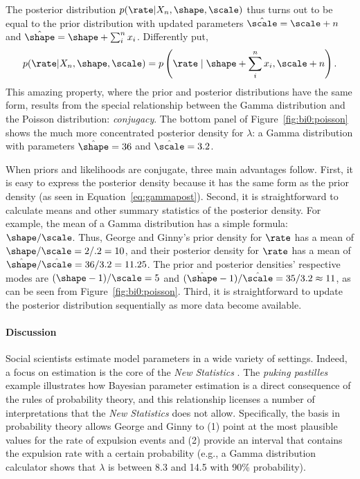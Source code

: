 The posterior distribution $p(\rate|X_n, \shape, \scale)$ thus turns out to be equal to the prior distribution with updated parameters $\hat\scale = \scale + n$ and $\hat\shape = \shape + \sum_i^n x_i$.  Differently put, \begin{equation}p(\rate|X_n,\shape,\scale) = p\left(\rate\mid\shape + \sum_i^n x_i, \scale + n\right).\label{eq:gammapost}\end{equation} This amazing property, where the prior and posterior distributions have the same form, results from the special relationship between the Gamma distribution and the Poisson distribution: \emph{conjugacy}. The bottom panel of Figure~\ref{fig:bi0:poisson} shows the much more concentrated posterior density for $\lambda$: a Gamma distribution with parameters $\hat\shape = 36$ and $\hat\scale = 3.2$. 

When priors and likelihoods are conjugate, three main advantages follow. First, it is easy to express the posterior density because it has the same form as the prior density (as seen in Equation~\ref{eq:gammapost}). Second, it is straightforward to calculate means and other summary statistics of the posterior density. For example, the mean of a Gamma distribution has a simple formula: $\shape/\scale$. Thus, George and Ginny's prior density for $\rate$ has a mean of $\shape/\scale=2/.2=10$, and their posterior density for $\rate$ has a mean of $\hat\shape/\hat\scale = 36/3.2 = 11.25$. The prior and posterior densities' respective modes are $(\shape-1)/\scale=5$ and $(\hat\shape-1)/\hat\scale = 35/3.2 \approx 11$, as can be seen from Figure~\ref{fig:bi0:poisson}. Third, it is straightforward to  update the posterior distribution sequentially as more data become available.

\paragraph{Discussion}  Social scientists estimate model parameters in a wide variety of settings. Indeed, a focus on estimation is the core of the \emph{New Statistics} \cite{Cumming2014}. The \emph{puking pastilles} example illustrates how Bayesian parameter estimation is a direct consequence of the rules of probability theory, and this relationship licenses a number of interpretations that the \emph{New Statistics} does not allow.  Specifically, the basis in probability theory allows George and Ginny to (1) point at the most plausible values for the rate of expulsion events and (2) provide an interval that contains the expulsion rate with a certain probability (e.g., a Gamma distribution calculator shows that $\lambda$ is between 8.3 and 14.5 with 90\% probability). 

